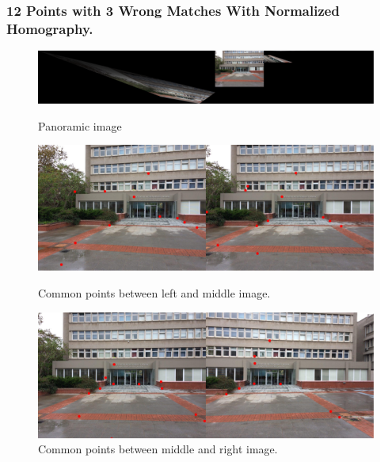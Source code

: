 \documentclass[letterpaper,12pt]{article}
\begin{document}
\subsubsection{12 Points with 3 Wrong Matches With Normalized Homography.}
\begin{figure}[!htb]
        \centering\includegraphics[width=1\columnwidth]{experiments/12points/norm/final3wrong.jpg}
          \caption{
                \label{} Panoramic image
        }
        \centering\includegraphics[width=1\columnwidth]{experiments/12points/norm/left-1_middle3wrong.jpg}
          \caption{
                \label{} Common points between left and middle image.
        }
        \centering\includegraphics[width=1\columnwidth]{experiments/12points/norm/middle_left-13wrong.jpg}
        \caption{
                \label{} Common points between middle and right image.
        }
\end{figure}
\FloatBarrier
\newpage
\end{document}
